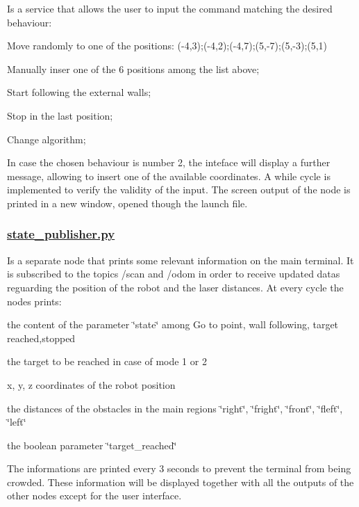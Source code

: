 Is a service that allows the user to input the command matching the desired behaviour\+:
\begin{DoxyEnumerate}
\item Move randomly to one of the positions\+: (-\/4,3);(-\/4,2);(-\/4,7);(5,-\/7);(5,-\/3);(5,1)
\item Manually inser one of the 6 positions among the list above;
\item Start following the external walls;
\item Stop in the last position;
\item Change algorithm;
\end{DoxyEnumerate}

In case the chosen behaviour is number 2, the inteface will display a further message, allowing to insert one of the available coordinates. A while cycle is implemented to verify the validity of the input. The screen output of the node is printed in a new window, opened though the launch file.

\subsubsection*{\hyperlink{state__publisher_8py}{state\+\_\+publisher.\+py}}

Is a separate node that prints some relevant information on the main terminal. It is subscribed to the topics /scan and /odom in order to receive updated datas reguarding the position of the robot and the laser distances. At every cycle the nodes prints\+:
\begin{DoxyItemize}
\item the content of the parameter \char`\"{}state\char`\"{} among \textquotesingle{}Go to point\textquotesingle{}, \textquotesingle{}wall following\textquotesingle{}, \textquotesingle{}target reached\textquotesingle{},\textquotesingle{}stopped\textquotesingle{}
\item the target to be reached in case of mode 1 or 2
\item x, y, z coordinates of the robot position
\item the distances of the obstacles in the main regions \char`\"{}right\char`\"{}, \char`\"{}fright\char`\"{}, \char`\"{}front\char`\"{}, \char`\"{}fleft\char`\"{}, \char`\"{}left\char`\"{}
\item the boolean parameter \char`\"{}target\+\_\+reached\char`\"{}
\end{DoxyItemize}

The informations are printed every 3 seconds to prevent the terminal from being crowded. These information will be displayed together with all the outputs of the other nodes except for the user interface.

